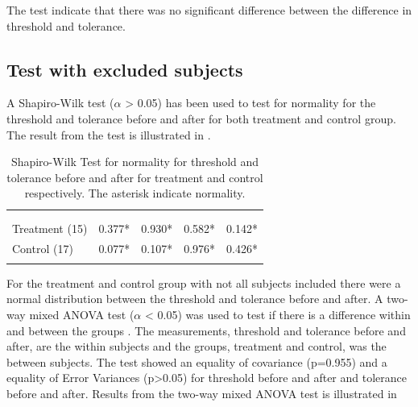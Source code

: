 The test indicate that there was no significant difference between the difference in threshold and tolerance.

\subsection{Test with excluded subjects}
A Shapiro-Wilk test ($\alpha$ > 0.05) has been used to test for normality for the threshold and tolerance before and after for both treatment and control group. The result from the test is illustrated in .

\begin{longtable} {l|c|c|c|c}
\rowcolor[HTML]{C0C0C0} 
  \color[HTML]{000000}{} & 
 \multicolumn{2}{c|}{ \color[HTML]{000000}{\textbf{Threshold}}} & \multicolumn{2}{c}{ \color[HTML]{000000}{\textbf{Tolerance}}}  	\\  \rule{0pt}{3ex} 
  \cellcolor[HTML]{C0C0C0}{} &
 \multicolumn{1}{c|}{ \cellcolor[HTML]{C0C0C0}{Pre }} & \multicolumn{1}{c|}{ \cellcolor[HTML]{C0C0C0}{Post}} 
 & \multicolumn{1}{|c|}{ \cellcolor[HTML]{C0C0C0}{Pre}} 
 & \multicolumn{1}{c}{ \cellcolor[HTML]{C0C0C0}{Post}} 	\\ \hline 
Treatment (15) & 0.377*  & 0.930* & 0.582* & 0.142* \\ \hline
Control (17)& 0.077* & 0.107* & 0.976* & 0.426* \\ \hline
	\caption{Shapiro-Wilk Test for normality for threshold and tolerance before and after for treatment and control respectively. The asterisk indicate normality.}
	\label{tab:ShapiroWilk1}
\end{longtable}
\vspace{-.5cm}

For the treatment and control group with not all subjects included there were a normal distribution between the threshold and tolerance before and after. A two-way mixed ANOVA test ($\alpha$ < 0.05) was used to test  if there is a difference within and between the groups . The measurements, threshold and tolerance before and after, are the within subjects and the groups, treatment and control, was the between subjects. The test showed an equality of covariance (p=0.955) and a equality of Error Variances (p>0.05) for threshold before and after and tolerance before and after. Results from the two-way mixed ANOVA test is illustrated in 

